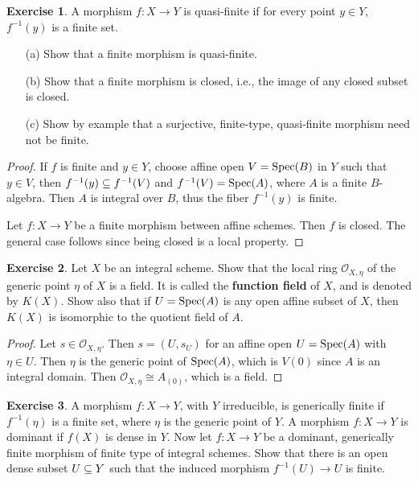 \documentclass[11pt]{book}
\theoremstyle{definition}
\newtheorem{exercise}{Exercise}[section]
\begin{document}
\begin{exercise}
A morphism $f:X\to Y$ is quasi-finite if for every point $y\in Y$, $f^{-1}(y)$ is a finite set.
\begin{itemize}
\item[(a)] Show that a finite morphism is quasi-finite.
\item[(b)] Show that a finite morphism is closed, i.e., the image of any closed subset is closed.
\item[(c)] Show by example that a surjective, finite-type, quasi-finite morphism need not be finite.
\end{itemize}
\end{exercise}
\begin{proof}
If $f$ is finite and $y\in Y$, choose affine open $V=\mathrm{Spec}(B)$ in $Y$ such that $y\in V$, then $f^{-1}(y)\subseteq f^{-1}(V)$ and $f^{-1}(V)=\mathrm{Spec}(A)$, where $A$ is a finite $B$-algebra. Then $A$ is integral over $B$, thus the fiber $f^{-1}(y)$ is finite.\par
Let $f:X\to Y$ be a finite morphism between affine schemes. Then $f$ is closed. The general case follows since being closed is a local property.
\end{proof}
\begin{exercise}
Let $X$ be an integral scheme. Show that the local ring $\mathscr{O}_{X,\eta}$ of the generic point $\eta$ of $X$ is a field. It is called the \textbf{function field} of $X$, and is denoted by $K(X)$. Show also that if $U=\mathrm{Spec}(A)$ is any open affine subset of $X$, then $K(X)$ is isomorphic to the quotient field of $A$.
\end{exercise}
\begin{proof}
Let $s\in\mathscr{O}_{X,\eta}$. Then $s=(U,s_U)$ for an affine open $U=\mathrm{Spec}(A)$ with $\eta\in U$. Then $\eta$ is the generic point of $\mathrm{Spec}(A)$, which is $V(0)$ since $A$ is an integral domain. Then $\mathscr{O}_{X,\eta}\cong A_{(0)}$, which is a field.
\end{proof}
\begin{exercise}
A morphism $f:X\to Y$, with $Y$ irreducible, is generically finite if $f^{-1}(\eta)$ is a finite set, where $\eta$ is the generic point of $Y$. A morphism $f:X\to Y$ is dominant if $f(X)$ is dense in $Y$. Now let $f:X\to Y$ be a dominant, generically finite morphism of finite type of integral schemes. Show that there is an open dense subset $U\subseteq Y$ such that the induced morphism $f^{-1}(U)\to U$ is finite.
\end{exercise}
\end{document}

